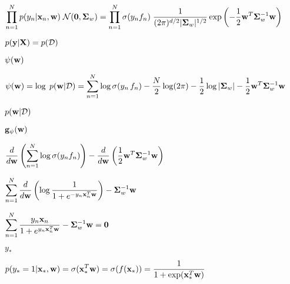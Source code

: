 \documentclass{article}
\def\lthtmlcheckvsize{\ifdim\ht\sizebox<\vsize 
  \ifdim\wd\sizebox<\hsize\expandafter\hfill\fi \expandafter\vfill
  \else\expandafter\vss\fi}%
\begin{document}
{\newpage\clearpage
{}%
$\displaystyle \prod_{n=1}^Np(y_n|{\bf x}_n,{\bf w})\;{\cal N}({\bf0},{\bf\Sigma}_w)
=\prod_{n=1}^N\sigma(y_nf_n)\;
\frac{1}{(2\pi)^{d/2}|{\bf\Sigma}_w|^{1/2}}
\exp\left(-\frac{1}{2}{\bf w}^T{\bf\Sigma}_w^{-1}{\bf w}\right)$%
\lthtmlindisplaymathZ
\lthtmlcheckvsize\clearpage}

{\newpage\clearpage
{}%
$ p({\bf y}|{\bf X})=p({\cal D})$%
\lthtmlindisplaymathZ
\lthtmlcheckvsize\clearpage}

{\newpage\clearpage
{}%
$ \psi({\bf w})$%
\lthtmlindisplaymathZ
\lthtmlcheckvsize\clearpage}

{\newpage\clearpage
{}%
$\displaystyle \psi({\bf w})=\log \;p({\bf w}|{\cal D})
=\sum_{n=1}^N \log \sigma(y_n\,f_n)
-\frac{N}{2}\log(2\pi)-\frac{1}{2}\log|{\bf\Sigma}_w|
-\frac{1}{2}{\bf w}^T{\bf\Sigma}_w^{-1}{\bf w}$%
\lthtmlindisplaymathZ
\lthtmlcheckvsize\clearpage}

{\newpage\clearpage
{}%
$ p({\bf w}|{\cal D})$%
\lthtmlindisplaymathZ
\lthtmlcheckvsize\clearpage}

{\newpage\clearpage
{}%
$\displaystyle {\bf g}_{\psi}({\bf w})$%
\lthtmlindisplaymathZ
\lthtmlcheckvsize\clearpage}

{\newpage\clearpage
{}%
$\displaystyle \frac{d}{d{\bf w}} \left(\sum_{n=1}^N\log \sigma(y_nf_n) \right)
-\frac{d}{d{\bf w}}\left(\frac{1}{2}{\bf w}^T{\bf\Sigma}_w^{-1}{\bf w}\right)$%
\lthtmlindisplaymathZ
\lthtmlcheckvsize\clearpage}

{\newpage\clearpage
{}%
$\displaystyle \sum_{n=1}^N\frac{d}{d{\bf w}}
\left(\log \frac{1}{1+e^{-y_n{\bf x}_n^T{\bf w}}}\right)
-{\bf\Sigma}_w^{-1}{\bf w}$%
\lthtmlindisplaymathZ
\lthtmlcheckvsize\clearpage}

{\newpage\clearpage
{}%
$\displaystyle \sum_{n=1}^N\frac{y_n{\bf x}_n }{1+e^{y_n{\bf x}_n^T{\bf w}}}
-{\bf\Sigma}_w^{-1}{\bf w} ={\bf0}$%
\lthtmlindisplaymathZ
\lthtmlcheckvsize\clearpage}

{\newpage\clearpage
{}%
$ y_*$%
\lthtmlindisplaymathZ
\lthtmlcheckvsize\clearpage}

{\newpage\clearpage
{}%
$\displaystyle p(y_*=1|{\bf x}_*,{\bf w})=\sigma({\bf x}_*^T{\bf w})
=\sigma(f({\bf x}_*))=\frac{1}{1+\exp({\bf x}_*^T{\bf w})}$%
\lthtmlindisplaymathZ
\lthtmlcheckvsize\clearpage}
\end{document}
